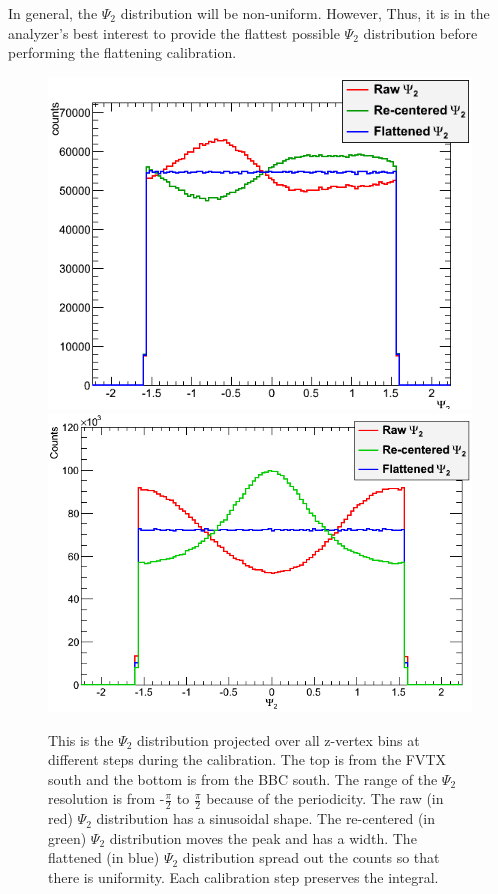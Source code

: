 In general, the $\Psi_2$ distribution will be non-uniform. However, Thus, it is in the analyzer's best interest
to provide the flattest possible $\Psi_2$ distribution before performing the flattening calibration.
\begin{figure}[!h]
\begin{center}
\includegraphics[width=0.65\linewidth]{figs/flattened_example_fvtx.png}
\includegraphics[width=0.62\linewidth]{figs/flattened_example_bbc.png}
\caption{This is the $\Psi_2$ distribution projected over all z-vertex bins at different steps during the calibration. The top is from the FVTX south and the bottom is from the BBC south. The range of the $\Psi_2$ resolution is from -$\frac{\pi}{2}$ to $\frac{\pi}{2}$ because of the periodicity. 
The raw (in red) $\Psi_2$ distribution has a sinusoidal shape. The re-centered (in green) $\Psi_2$ distribution moves the peak and has a width. The flattened (in blue) 
$\Psi_2$ distribution spread out the counts so that there is uniformity. Each calibration step preserves the integral.}
\end{center}
\label{fig:calibrated_psi}
\end{figure}

